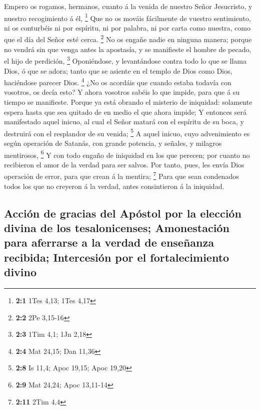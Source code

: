  Empero os rogamos, hermanos, cuanto á la venida de
nuestro Señor Jesucristo, y nuestro recogimiento á él, \footnote{\textbf{2:1}
  1Tes 4,13; 1Tes 4,17}  Que no os mováis fácilmente de
vuestro sentimiento, ni os conturbéis ni por espíritu, ni por palabra,
ni por carta como nuestra, como que el día del Señor esté cerca.
\footnote{\textbf{2:2} 2Pe 3,15-16}  No os engañe nadie en
ninguna manera; porque no vendrá sin que venga antes la apostasía, y se
manifieste el hombre de pecado, el hijo de perdición, \footnote{\textbf{2:3}
  1Tim 4,1; 1Jn 2,18}  Oponiéndose, y levantándose contra
todo lo que se llama Dios, ó que se adora; tanto que se asiente en el
templo de Dios como Dios, haciéndose parecer Dios. \footnote{\textbf{2:4}
  Mat 24,15; Dan 11,36}  ¿No os acordáis que cuando estaba
todavía con vosotros, os decía esto?  Y ahora vosotros
sabéis lo que impide, para que á su tiempo se manifieste. 
Porque ya está obrando el misterio de iniquidad: solamente espera hasta
que sea quitado de en medio el que ahora impide;  Y
entonces será manifestado aquel inicuo, al cual el Señor matará con el
espíritu de su boca, y destruirá con el resplandor de su venida;
\footnote{\textbf{2:8} Is 11,4; Apoc 19,15; Apoc 19,20}  A
aquel inicuo, cuyo advenimiento es según operación de Satanás, con
grande potencia, y señales, y milagros mentirosos, \footnote{\textbf{2:9}
  Mat 24,24; Apoc 13,11-14}  Y con todo engaño de
iniquidad en los que perecen; por cuanto no recibieron el amor de la
verdad para ser salvos.  Por tanto, pues, les envía Dios
operación de error, para que crean á la mentira; \footnote{\textbf{2:11}
  2Tim 4,4}  Para que sean condenados todos los que no
creyeron á la verdad, antes consintieron á la iniquidad.

\hypertarget{acciuxf3n-de-gracias-del-apuxf3stol-por-la-elecciuxf3n-divina-de-los-tesalonicenses-amonestaciuxf3n-para-aferrarse-a-la-verdad-de-enseuxf1anza-recibida-intercesiuxf3n-por-el-fortalecimiento-divino}{%
\subsection{Acción de gracias del Apóstol por la elección divina de los
tesalonicenses; Amonestación para aferrarse a la verdad de enseñanza
recibida; Intercesión por el fortalecimiento
divino}\label{acciuxf3n-de-gracias-del-apuxf3stol-por-la-elecciuxf3n-divina-de-los-tesalonicenses-amonestaciuxf3n-para-aferrarse-a-la-verdad-de-enseuxf1anza-recibida-intercesiuxf3n-por-el-fortalecimiento-divino}}

